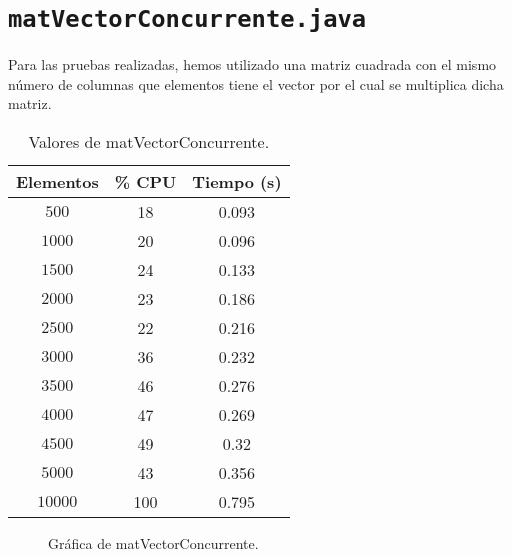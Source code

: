 \documentclass[12pt,letterpaper]{article}
\begin{document}
\section{\texttt{matVectorConcurrente.java}}
\noindent
Para las pruebas realizadas, hemos utilizado una matriz cuadrada con el mismo número de columnas que elementos tiene el vector por el cual se multiplica dicha matriz.
\begin{center}
	\begin{table}[htbp]
		\begin{center}
			\begin{tabular}{|c|c|c|}
				\hline
				\textbf{Elementos} & \textbf{\% CPU} & \textbf{Tiempo (s)}  \\
				\hline 
				$500$ & 18 & 0.093\\ \hline	
				$1000$ & 20 & 0.096\\ \hline
				$1500$ & 24 & 0.133\\ \hline
				$2000$ & 23 & 0.186\\ \hline
				$2500$ & 22 & 0.216\\ \hline
				$3000$ & 36 & 0.232\\ \hline
				$3500$ & 46 & 0.276\\ \hline
				$4000$ & 47 & 0.269\\ \hline
				$4500$ & 49 & 0.32\\ \hline
				$5000$ & 43 & 0.356\\ \hline				
				$10000$ & 100 & 0.795\\ \hline	
			\end{tabular}
			\caption{Valores de matVectorConcurrente.}
			\label{tabla:Valores de matVectorConcurrente}
		\end{center}
	\end{table}
\end{center}
\begin{figure}
	\begin{center}
		\caption{Gráfica de matVectorConcurrente.}
		\label{fig: matVectorConcurrente}
	\end{center}	
\end{figure}


\newpage
\end{document}
